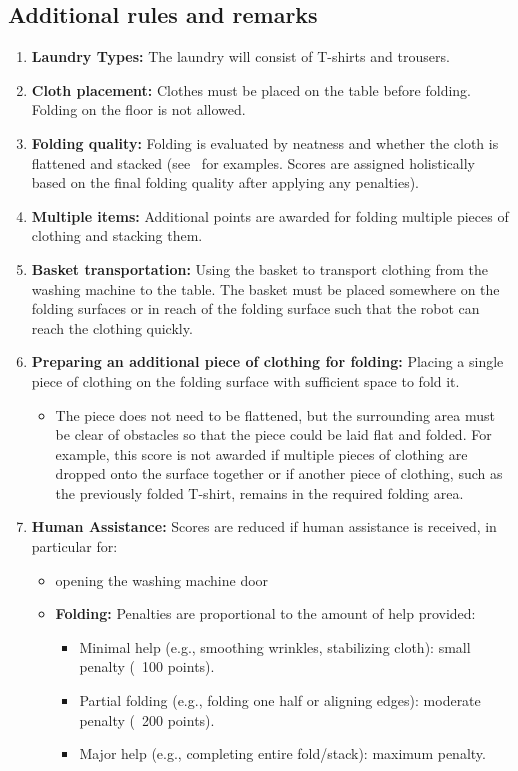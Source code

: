 \subsection*{Additional rules and remarks}
\begin{enumerate}
    \item \textbf{Laundry Types:} The laundry will consist of T-shirts and trousers.
    \item \textbf{Cloth placement:} Clothes must be placed on the table before folding. Folding on the floor is not allowed.
    \item \textbf{Folding quality:} Folding is evaluated by neatness and whether the cloth is flattened and stacked (see~ for examples. Scores are assigned holistically based on the final folding quality after applying any penalties).
    \item \textbf{Multiple items:} Additional points are awarded for folding multiple pieces of clothing and stacking them.
    \item \textbf{Basket transportation:} Using the basket to transport clothing from the washing machine to the table. The basket must be placed somewhere on the folding surfaces or in reach of the folding surface such that the robot can reach the clothing quickly.
    \item \textbf{Preparing an additional piece of clothing for folding:}
    Placing a single piece of clothing on the folding surface with sufficient space to fold it. 
    \begin{itemize}
        \item The piece does not need to be flattened, but the surrounding area must be clear of obstacles so that the piece could be laid flat and folded. For example, this score is not awarded if multiple pieces of clothing are dropped onto the surface together or if another piece of clothing, such as the previously folded T-shirt, remains in the required folding area.
    \end{itemize}
    \item \textbf{Human Assistance:} Scores are reduced if human assistance is received, in particular for:
    \begin{itemize}
        \item opening the washing machine door
        \item \textbf{Folding:} Penalties are proportional to the amount of help provided:
        \begin{itemize}[nosep]
            \item Minimal help (e.g., smoothing wrinkles, stabilizing cloth): small penalty (~100 points).
            \item Partial folding (e.g., folding one half or aligning edges): moderate penalty (~200 points).
            \item Major help (e.g., completing entire fold/stack): maximum penalty.
        \end{itemize}
    \end{itemize}
\end{enumerate}

